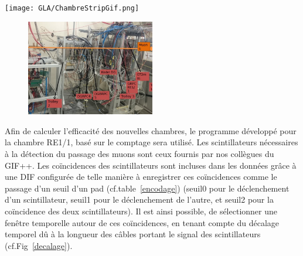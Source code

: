 \marginpar
{
	\centering
	\texttt{[image: GLA/ChambreStripGif.png]}
	\label{nouvellestrip}
}
\vspace*{-0.2cm}
\begin{figure}[ht!]
	\centering
	\includegraphics[width=0.50\textwidth]{GLA/setup.png}
	\label{bati}
\end{figure}
\vspace*{-0.2cm}
Afin de calculer l'efficacité des nouvelles chambres, le programme développé pour la chambre RE1/1, basé sur le comptage sera utilisé. Les scintillateurs nécessaires à la détection du passage des muons sont ceux fournis par nos collègues du GIF++. Les coïncidences des scintillateurs sont incluses dans les données grâce à une DIF configurée de telle manière à enregistrer ces coïncidences comme le passage d'un seuil d'un pad (cf.table~\ref{encodage}) (seuil0 pour le déclenchement d'un scintillateur, seuil1 pour le déclenchement de l'autre, et seuil2 pour la coïncidence des deux scintillateurs). Il est ainsi possible, de sélectionner une fenêtre temporelle autour de ces coïncidences, en tenant compte du décalage temporel dû à la longueur des câbles portant le signal des scintillateurs (cf.Fig~\ref{decalage}). 

